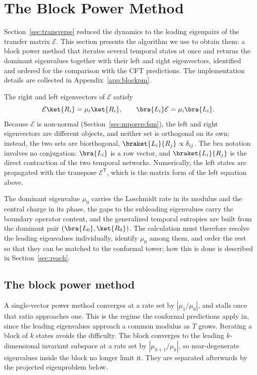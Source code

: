 \FloatBarrier
\section{The Block Power Method}
\label{sec:numerics}
\label{sec:nonhermitian}

Section~\ref{sec:transverse} reduced the dynamics to the leading eigenpairs of the transfer matrix $\mathcal{E}$. This section presents the algorithm we use to obtain them: a block power method that iterates several temporal states at once and returns the dominant eigenvalues together with their left and right eigenvectors, identified and ordered for the comparison with the \ac{CFT} predictions. The implementation details are collected in Appendix~\ref{app:blockpm}.

The right and left eigenvectors of $\mathcal{E}$ satisfy
\begin{equation}
  \mathcal{E}\ket{R_i}=\mu_i\ket{R_i},
  \qquad
  \bra{L_i}\mathcal{E}=\mu_i\bra{L_i}.
  \label{eq:nonhermitian_eigenproblem}
\end{equation}
Because $\mathcal{E}$ is non-normal (Section~\ref{sec:mporep:fsm}), the left and right eigenvectors are different objects, and neither set is orthogonal on its own; instead, the two sets are biorthogonal, $\braket{L_i}{R_j}\propto\delta_{ij}$. The bra notation involves no conjugation: $\bra{L_i}$ is a row vector, and $\braket{L_i}{R_j}$ is the direct contraction of the two temporal networks. Numerically, the left states are propagated with the transpose $\mathcal{E}^{\mathsf T}$, which is the matrix form of the left equation above.

The dominant eigenvalue $\mu_0$ carries the Loschmidt rate in its modulus and the central charge in its phase, the gaps to the subleading eigenvalues carry the boundary operator content, and the generalized temporal entropies are built from the dominant pair $(\bra{L_0},\ket{R_0})$. The calculation must therefore resolve the leading eigenvalues individually, identify $\mu_0$ among them, and order the rest so that they can be matched to the conformal tower; how this is done is described in Section~\ref{sec:reach}.

\subsection{The block power method}
\label{sec:blockpm}

A single-vector power method converges at a rate set by $|\mu_1/\mu_0|$, and stalls once that ratio approaches one. This is the regime the conformal predictions apply in, since the leading eigenvalues approach a common modulus as $T$ grows. Iterating a block of $k$ states avoids the difficulty. The block converges to the leading $k$-dimensional invariant subspace at a rate set by $|\mu_{k+1}/\mu_k|$, so near-degenerate eigenvalues inside the block no longer limit it. They are separated afterwards by the projected eigenproblem below.

